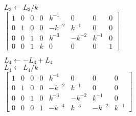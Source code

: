 \begin{exercice}
\begin{sol}
\begin{enumerate}
\begin{multicols}{2}
        $L_3 \leftarrow L_3/k$ \\
        \columnbreak
        $%
        \left[
          \begin{array}{rrrr|rrrr}
            1 & 0 & 0 & 0 &  k^{-1} &      0 &      0 & 0 \\
            0 & 1 & 0 & 0 & -k^{-2} &  k^{-1} &     0 & 0 \\
            0 & 0 & 1 & 0 &  k^{-3} & -k^{-2} & k^{-1} & 0 \\
            0 & 0 & 1 & k &       0 &      0 & 0 & 1
          \end{array}
        \right]
        $
      \end{multicols}
      \begin{multicols}{2}
        $L_4 \leftarrow - L_3 + L_4$ \\
        $L_4 \leftarrow L_4/k$ \\
        \columnbreak
        $%
        \left[
          \begin{array}{rrrr|rrrr}
            1 & 0 & 0 & 0 &  k^{-1} &      0 &       0 & 0 \\
            0 & 1 & 0 & 0 & -k^{-2} &  k^{-1} &      0 & 0 \\
            0 & 0 & 1 & 0 &  k^{-3} & -k^{-2} &  k^{-1} & 0 \\
            0 & 0 & 0 & 1 & -k^{-4} &  k^{-3} & -k^{-2} & k^{-1}
          \end{array}
        \right]
        $
      \end{multicols}
      \setlength{\columnsep}{\ocolumnsep}
    \end{enumerate}
  \end{sol}
  \begin{rep}
    \raggedright
\end{rep}
\end{exercice}
